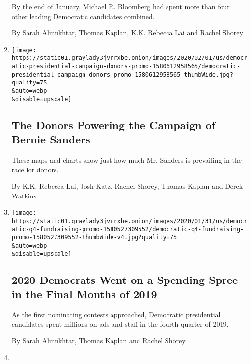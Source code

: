 \begin{enumerate}
  By the end of January, Michael R. Bloomberg had spent more than four
  other leading Democratic candidates combined.

  By Sarah Almukhtar, Thomas Kaplan, K.K. Rebecca Lai and Rachel Shorey
\item
  \href{/interactive/2020/02/01/us/politics/democratic-presidential-campaign-donors.html}{}

  \texttt{[image: https://static01.graylady3jvrrxbe.onion/images/2020/02/01/us/democratic-presidential-campaign-donors-promo-1580612958565/democratic-presidential-campaign-donors-promo-1580612958565-thumbWide.jpg?quality=75\\\&auto=webp\\\&disable=upscale]}

  \hypertarget{the-donors-powering-the-campaign-of-bernie-sanders}{%
  \subsection{The Donors Powering the Campaign of Bernie
  Sanders}\label{the-donors-powering-the-campaign-of-bernie-sanders}}

  These maps and charts show just how much Mr. Sanders is prevailing in
  the race for donors.

  By K.K. Rebecca Lai, Josh Katz, Rachel Shorey, Thomas Kaplan and Derek
  Watkins
\item
  \href{/interactive/2020/02/01/us/elections/democratic-q4-fundraising.html}{}

  \texttt{[image: https://static01.graylady3jvrrxbe.onion/images/2020/01/31/us/democratic-q4-fundraising-promo-1580527309552/democratic-q4-fundraising-promo-1580527309552-thumbWide-v4.jpg?quality=75\\\&auto=webp\\\&disable=upscale]}

  \hypertarget{2020-democrats-went-on-a-spending-spree-in-the-final-months-of-2019}{%
  \subsection{2020 Democrats Went on a Spending Spree in the Final
  Months of
  2019}\label{2020-democrats-went-on-a-spending-spree-in-the-final-months-of-2019}}

  As the first nominating contests approached, Democratic presidential
  candidates spent millions on ads and staff in the fourth quarter of
  2019.

  By Sarah Almukhtar, Thomas Kaplan and Rachel Shorey
\item
  \href{/2019/11/08/us/hospitals-lawsuits-medical-debt.html}{}


\end{enumerate}
